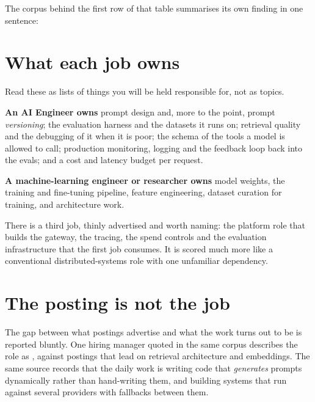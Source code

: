The corpus behind the first row of that table summarises its own finding in one
sentence: 

\section{What each job owns}

Read these as lists of things you will be held responsible for, not as topics.

\textbf{An AI Engineer owns} prompt design and, more to the point, prompt
\emph{versioning}; the evaluation harness and the datasets it runs on;
retrieval quality and the debugging of it when it is poor; the schema of the
tools a model is allowed to call; production monitoring, logging and the
feedback loop back into the evals; and a cost and latency budget per
request.

\textbf{A machine-learning engineer or researcher owns} model weights, the
training and fine-tuning pipeline, feature engineering, dataset curation for
training, and architecture work.

There is a third job, thinly advertised and worth naming: the platform role
that builds the gateway, the tracing, the spend controls and the evaluation
infrastructure that the first job consumes. It is scored much more like a
conventional distributed-systems role with one unfamiliar dependency.

\section{The posting is not the job}

The gap between what postings advertise and what the work turns out to be is
reported bluntly. One hiring manager quoted in the same corpus describes the
role as , against postings that lead on retrieval
architecture and embeddings. The same source records that the daily work is
writing code that \emph{generates} prompts dynamically rather than hand-writing
them, and building systems that run against several providers with fallbacks
between them.


